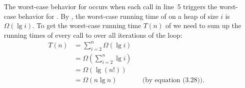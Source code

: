 The worst-case behavior for  occurs when each call in line~5 triggers the worst-case behavior for .
By , the worst-case running time of  on a heap of size $i$ is $\Omega(\lg i)$.
To get the worst-case running time $T(n)$ of  we need to sum up the running times of every call to  over all iterations of the  loop:
\begin{align*}
    T(n) &= \sum_{i=2}^n\Omega(\lg i) \\
    &= \Omega\left(\sum_{i=2}^n\lg i\right) \\
    &= \Omega(\lg(n!)) \\
    &= \Omega(n\lg n) && \text{(by equation (3.28))}.
\end{align*}

